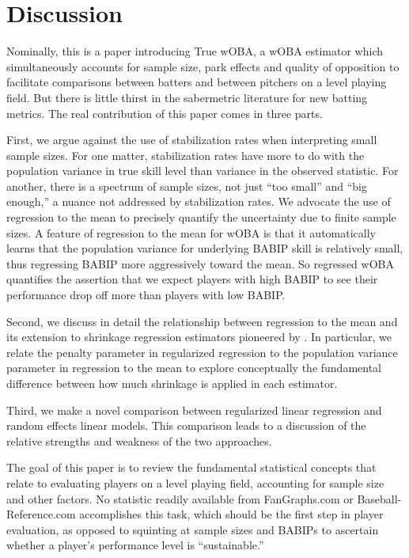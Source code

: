 \documentclass[11pt]{article}
\begin{document}
\section{Discussion}

Nominally, this is a paper introducing True wOBA, a wOBA estimator which
simultaneously accounts for sample size, park effects and quality of opposition
to facilitate comparisons between batters and between pitchers on a level
playing field. But there is little thirst in the sabermetric literature for
new batting metrics. The real contribution of this paper comes in
three parts.

First, we argue against the use of stabilization rates when interpreting small
sample sizes. For one matter, stabilization rates have more to do with the
population variance in true skill level than variance in the observed
statistic. For another, there is a spectrum of sample sizes, not just ``too
small'' and ``big enough,'' a nuance not addressed by stabilization rates. We
advocate the use of regression to the mean to precisely quantify the
uncertainty due to finite sample sizes. A feature of regression to the mean for
wOBA is that it automatically learns that the population variance for
underlying BABIP skill is relatively small, thus regressing BABIP more
aggressively toward the mean. So regressed wOBA quantifies the assertion that
we expect players with high BABIP to see their performance drop off more than
players with low BABIP.

Second, we discuss in detail the relationship between regression to the mean
and its extension to shrinkage regression estimators pioneered by
\citet{Judge15}. In particular, we relate the penalty parameter in regularized
regression to the population variance parameter in regression to the mean to
explore conceptually the fundamental difference between how much shrinkage is
applied in each estimator.

Third, we make a novel comparison between regularized linear regression and
random effects linear models. This comparison leads to a discussion of the
relative strengths and weakness of the two approaches.

The goal of this paper is to review the fundamental statistical concepts that
relate to evaluating players on a level playing field, accounting for sample
size and other factors. No statistic readily available from FanGraphs.com or
Baseball-Reference.com accomplishes this task, which should be the first step
in player evaluation, as opposed to squinting at sample sizes and BABIPs to
ascertain whether a player's performance level is ``sustainable.''






\end{document}
